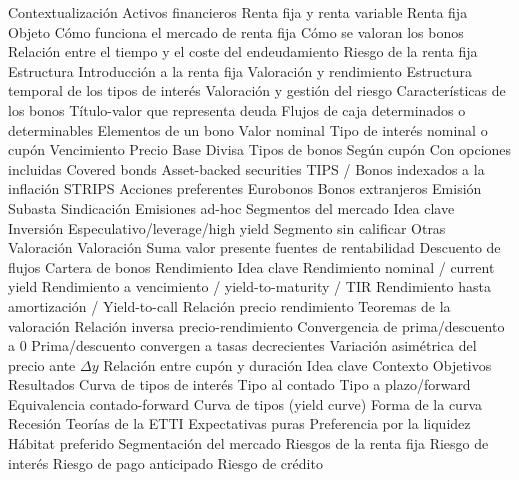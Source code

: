 \documentclass{nuevotema}
\begin{document}
\esquemacorto

\begin{esquema}[enumerate]
	\1[] 
		\2 Contextualización
			\3 Activos financieros
			\3 Renta fija y renta variable
			\3 Renta fija
		\2 Objeto
			\3 Cómo funciona el mercado de renta fija
			\3 Cómo se valoran los bonos
			\3 Relación entre el tiempo y el coste del endeudamiento
			\3 Riesgo de la renta fija
		\2 Estructura
			\3 Introducción a la renta fija
			\3 Valoración y rendimiento
			\3 Estructura temporal de los tipos de interés
			\3 Valoración y gestión del riesgo
	\1 
		\2 Características de los bonos
			\3 Título-valor que representa deuda
			\3 Flujos de caja determinados o determinables
		\2 Elementos de un bono
			\3 Valor nominal
			\3 Tipo de interés nominal o cupón
			\3 Vencimiento
			\3 Precio
			\3 Base
			\3 Divisa
		\2 Tipos de bonos
			\3 Según cupón
			\3 Con opciones incluidas
			\3 Covered bonds
			\3 Asset-backed securities
			\3 TIPS / Bonos indexados a la inflación
			\3 STRIPS
			\3 Acciones preferentes
			\3 Eurobonos
			\3 Bonos extranjeros
		\2 Emisión
			\3 Subasta
			\3 Sindicación
			\3 Emisiones ad-hoc
		\2 Segmentos del mercado
			\3 Idea clave
			\3 Inversión
			\3 Especulativo/leverage/high yield
			\3 Segmento sin calificar
			\3 Otras
			\3 Valoración
	\1 
		\2 Valoración
			\3 Suma valor presente fuentes de rentabilidad
			\3 Descuento de flujos
			\3 Cartera de bonos
		\2 Rendimiento
			\3 Idea clave
			\3 Rendimiento nominal / current yield
			\3 Rendimiento a vencimiento / yield-to-maturity / TIR
			\3 Rendimiento hasta amortización / Yield-to-call
			\3 Relación precio rendimiento
		\2 Teoremas de la valoración
			\3 Relación inversa precio-rendimiento
			\3 Convergencia de prima/descuento a 0
			\3 Prima/descuento convergen a tasas decrecientes
			\3 Variación asimétrica del precio ante $\Delta y$
			\3 Relación entre cupón y duración
	\1 
		\2 Idea clave
			\3 Contexto
			\3 Objetivos
			\3 Resultados
		\2 Curva de tipos de interés
			\3 Tipo al contado
			\3 Tipo a plazo/forward
			\3 Equivalencia contado-forward
			\3 Curva de tipos (yield curve)
			\3 Forma de la curva
			\3 Recesión
		\2 Teorías de la ETTI
			\3 Expectativas puras
			\3 Preferencia por la liquidez
			\3 Hábitat preferido
			\3 Segmentación del mercado
	\1 
		\2 Riesgos de la renta fija
			\3 Riesgo de interés
			\3 Riesgo de pago anticipado
			\3 Riesgo de crédito

\end{esquema}
\end{document}
